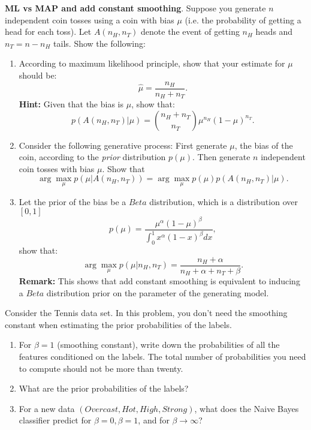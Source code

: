 \documentclass[11pt]{article}
\newenvironment{problem}[2][Problem]{\begin{trivlist}
\item[\hskip \labelsep {\bfseries #1}\hskip \labelsep {\bfseries #2.}]}{\end{trivlist}}
\begin{document}
\begin{problem} {2. (10 points)}
	\textbf{ML vs MAP and add constant smoothing}. Suppose you generate $n$ independent coin tosses using a coin with bias $\mu$ (i.e. the probability of getting a head for each toss). Let $A(n_H, n_T)$ denote the event of getting $n_H$ heads and $n_T = n - n_H$ tails. Show the following:
	\begin{enumerate}
		\item According to maximum likelihood principle, show that your estimate for $\mu$ should be:
		\[
			\hat{\mu} = \frac{n_H}{n_H + n_T}.
		\]
		\textbf{Hint:} 	Given that the bias is $\mu$, show that:
		\[
		p(A(n_H, n_T)|\mu) = {{n_H+n_T} \choose {n_T}} \mu^{n_H} (1 - \mu)^{n_T}.
		\]
		\item Consider the following generative process: First generate $\mu$, the bias of the coin, according to the \emph{prior} distribution $p(\mu)$. Then generate $n$ independent coin tosses with bias $\mu$. Show that
		\[
			\arg \max_{\mu} p(\mu | A(n_H, n_T)) = \arg \max_{\mu} p(\mu) p( A(n_H, n_T) | \mu). 
		\]
		
		\item Let the prior of the bias be a $Beta$ distribution, which is a distribution over $[0,1]$
		\[
			p(\mu) = \frac{\mu^\alpha (1-\mu)^\beta}{\int_0^1 x^\alpha (1-x)^\beta dx},
		\]
		show that:
		\[
			\arg \max_{\mu} p(\mu | n_H, n_T) = \frac{n_H + \alpha}{n_H + \alpha + n_T + \beta}.
		\]
		\textbf{Remark:} This shows that add constant smoothing is equivalent to inducing a $Beta$ distribution prior on the parameter of the generating model.
	\end{enumerate}
	
\end{problem}

\begin{problem}{3. (10 points)}
	Consider the Tennis data set. In this problem, you don't need the smoothing constant when estimating the prior probabilities of the labels.
	\begin{enumerate}
		\item 
		For $\beta = 1$ (smoothing constant), write down the probabilities of all the features conditioned on the labels. The total number of probabilities you need to compute should not be more than twenty. 
		\item
		What are the prior probabilities of the labels? 
		\item
		For a new data $(Overcast, Hot, High, Strong)$, what does the Naive Bayes classifier predict for $\beta=0, \beta=1$, and for $\beta\to\infty$?
	\end{enumerate}
\end{problem}
\end{document}
